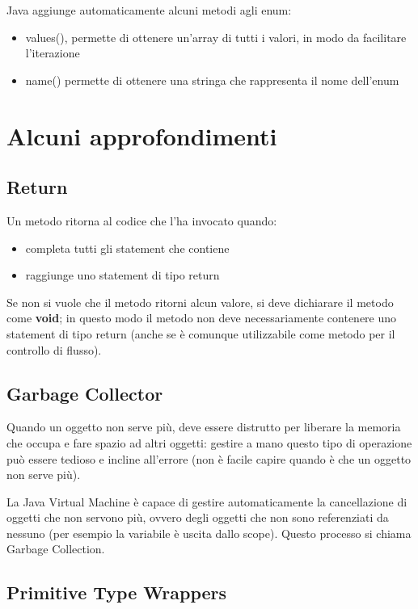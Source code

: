 \documentclass[a4paper,12pt,twoside]{book}
\begin{document}
Java aggiunge automaticamente alcuni metodi agli enum:
\begin{itemize}
\item values(), permette di ottenere un'array di tutti i valori, in
  modo da facilitare l'iterazione
\item name() permette di ottenere una stringa che rappresenta il nome
  dell'enum
\end{itemize}


\section{Alcuni approfondimenti}


\subsection{Return}

Un metodo ritorna al codice che l'ha invocato quando:
\begin{itemize}
\item completa tutti gli statement che contiene
\item raggiunge uno statement di tipo return
\end{itemize}

Se non si vuole che il metodo ritorni alcun valore, si deve dichiarare
il metodo come \textbf{void}; in questo modo il metodo non deve
necessariamente contenere uno statement di tipo return (anche se è
comunque utilizzabile come metodo per il controllo di flusso).

\subsection{Garbage Collector}
Quando un oggetto non serve più, deve essere distrutto per liberare la
memoria che occupa e fare spazio ad altri oggetti: gestire a mano
questo tipo di operazione può essere tedioso e incline all'errore (non
è facile capire quando è che un oggetto non serve più).

La Java Virtual Machine è capace di gestire automaticamente la
cancellazione di oggetti che non servono più, ovvero degli oggetti che
non sono referenziati da nessuno (per esempio la variabile è uscita
dallo scope). Questo processo si chiama Garbage Collection.

\subsection{Primitive Type Wrappers}
\end{document}
